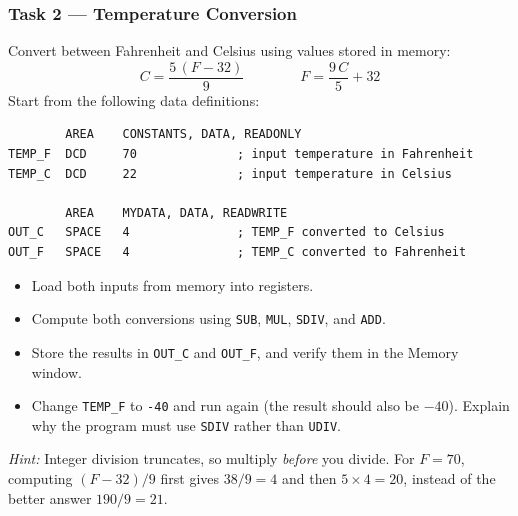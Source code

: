 \subsubsection{Task 2 --- Temperature Conversion}
Convert between Fahrenheit and Celsius using values stored in memory:
\[
C = \frac{5\,(F - 32)}{9} \qquad\qquad F = \frac{9\,C}{5} + 32
\]
Start from the following data definitions:
\begin{lstlisting}
        AREA    CONSTANTS, DATA, READONLY
TEMP_F  DCD     70              ; input temperature in Fahrenheit
TEMP_C  DCD     22              ; input temperature in Celsius

        AREA    MYDATA, DATA, READWRITE
OUT_C   SPACE   4               ; TEMP_F converted to Celsius
OUT_F   SPACE   4               ; TEMP_C converted to Fahrenheit
\end{lstlisting}
\begin{itemize}[nosep]
    \item Load both inputs from memory into registers.
    \item Compute both conversions using \texttt{SUB}, \texttt{MUL}, \texttt{SDIV}, and \texttt{ADD}.
    \item Store the results in \texttt{OUT\_C} and \texttt{OUT\_F}, and verify them in the Memory window.
    \item Change \texttt{TEMP\_F} to \texttt{-40} and run again (the result should also be $-40$). Explain why the program must use \texttt{SDIV} rather than \texttt{UDIV}.
\end{itemize}
\emph{Hint:} Integer division truncates, so multiply \emph{before} you divide. For $F = 70$, computing $(F-32)/9$ first gives $38/9 = 4$ and then $5 \times 4 = 20$, instead of the better answer $190/9 = 21$.
